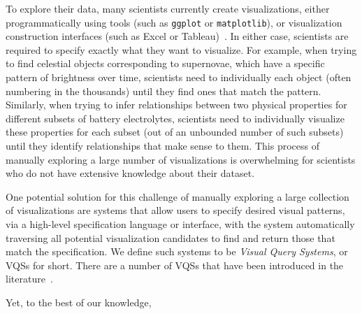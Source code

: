 To explore their data, many scientists currently
create visualizations, either programmatically using 
tools (such as {\tt ggplot} or {\tt matplotlib}),
or visualization construction interfaces (such as 
Excel or Tableau)~\cite{Momcheva2015,Prabhu2011}.
In either case, scientists are required to specify exactly what
they want to visualize.  For example, when trying to find celestial objects
corresponding to supernovae, which have a specific pattern
of brightness over time, scientists
need to individually  each object (often numbering in the thousands) until they find ones that match the pattern. Similarly, when trying to infer relationships between two physical properties for different subsets of battery electrolytes, scientists need to individually visualize these properties
for each subset (out of an unbounded number of such subsets)
until they identify relationships that make sense to them. This process of manually exploring a large number of visualizations 
is  overwhelming for scientists who do not have extensive knowledge about their
dataset. 
\par One potential solution for this challenge of manually exploring a large collection of visualizations
are systems that allow users to specify 
desired visual patterns, via a high-level specification language
or interface, with the system automatically
traversing all potential visualization candidates to find
and return those that match the specification. 
We define such systems to be {\em Visual Query Systems}, or VQSs for short.
There are a number of VQSs that have been introduced in the literature~\cite{mohebbi2011google,Hochheiser2004,wattenberg2001sketching,Siddiqui2017VLDB,ryall2005querylines}. 
\par {}
Yet, to the best of our knowledge, 
